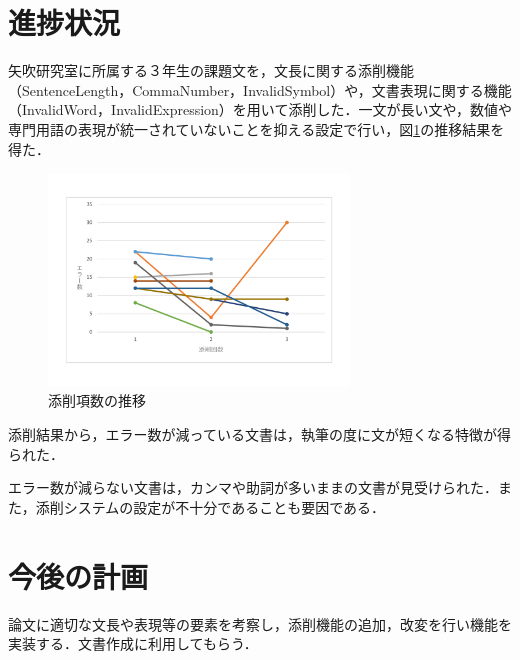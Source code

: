 \documentclass[uplatex,twocolumn,dvipdfmx]{jsarticle}
\begin{document}
\section{進捗状況}
矢吹研究室に所属する３年生の課題文を，文長に関する添削機能（SentenceLength，CommaNumber，InvalidSymbol）や，文書表現に関する機能（InvalidWord，InvalidExpression）を用いて添削した．一文が長い文や，数値や専門用語の表現が統一されていないことを抑える設定で行い，図\ref{conf}の推移結果を得た．

\begin{figure}[h]
\centering
\includegraphics[width=8cm,clip]{images.pdf}
\caption{添削項数の推移}\label{conf}
\end{figure}

添削結果から，エラー数が減っている文書は，執筆の度に文が短くなる特徴が得られた．

エラー数が減らない文書は，カンマや助詞が多いままの文書が見受けられた．また，添削システムの設定が不十分であることも要因である．



\section{今後の計画}
論文に適切な文長や表現等の要素を考察し，添削機能の追加，改変を行い機能を実装する．文書作成に利用してもらう．



\end{document}
